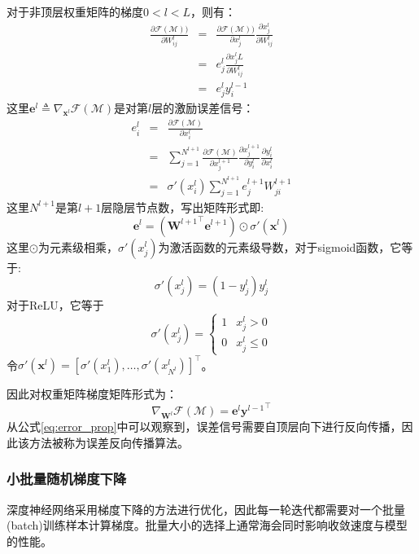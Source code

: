 对于非顶层权重矩阵的梯度$0<l<L$，则有：
\begin{eqnarray}
    \frac{\partial \mathcal{F}(\mathcal{M}))}{\partial W^l_{ij}} &=& \frac{\partial \mathcal{F}(\mathcal{M}))}{\partial x^l_j} \frac{\partial x_j^l}{\partial W^l_{ij}} \\
    &=& e^l_j \frac{\partial x^l_jL}{\partial W^l_{ij}} \\
    &=& e^l_j y^{l-1}_i
\end{eqnarray}
这里$\mathbf{e}^l \triangleq \nabla_{\mathbf{x}^l} \mathcal{F}(\mathcal{M})$是对第$l$层的激励误差信号：
\begin{eqnarray}
    e^l_i &=& \frac{\partial \mathcal{F}(\mathcal{M})}{\partial x^l_i} \\
    &=& \sum_{j=1}^{N^{l+1}} \frac{\partial \mathcal{F}(\mathcal{M})}{\partial x^{l+1}_j} \frac{\partial x^{l+1}_j}{\partial y^l_i} \frac{\partial y^{l}_i}{\partial x^l_i} \\
    &=& \sigma'(x^{l}_i)  \sum_{j=1}^{N^{l+1}} e^{l+1}_j W^{l+1}_{ji}
\end{eqnarray}
这里$N^{l+1}$是第$l+1$层隐层节点数，写出矩阵形式即:
\begin{equation}
    \label{eq:error_prop}
    \mathbf{e}^l = ( {\mathbf{W}^{l+1}}^{\top} \mathbf{e}^{l+1} ) \odot \sigma'(\mathbf{x}^l)
\end{equation}
这里$\odot$为元素级相乘，$\sigma'(x^l_j)$为激活函数的元素级导数，对于sigmoid函数，它等于:
\begin{equation}
    \sigma'(x^l_j)=(1-y^l_j)y^l_j
\end{equation}
对于ReLU，它等于
\begin{equation}
    \sigma'(x^l_j)=
    \begin{cases}
        1& x^l_j > 0 \\
        0& x^l_j \le 0
    \end{cases}
\end{equation}
令$\sigma'(\mathbf{x}^l) = [\sigma'(x^l_1), \dots, \sigma'(x^l_{N^l})]^{\top}$。

因此对权重矩阵梯度矩阵形式为：
\begin{equation}
    \nabla_{\mathbf{W}^l} \mathcal{F}(\mathcal{M}) = \mathbf{e}^l {\mathbf{y}^{l-1}}^{\top}
\end{equation}
从公式\ref{eq:error_prop}中可以观察到，误差信号需要自顶层向下进行反向传播，因此该方法被称为误差反向传播算法。

\subsubsection{小批量随机梯度下降}
深度神经网络采用梯度下降的方法进行优化，因此每一轮迭代都需要对一个批量(batch)训练样本计算梯度。批量大小的选择上通常海会同时影响收敛速度与模型的性能。

